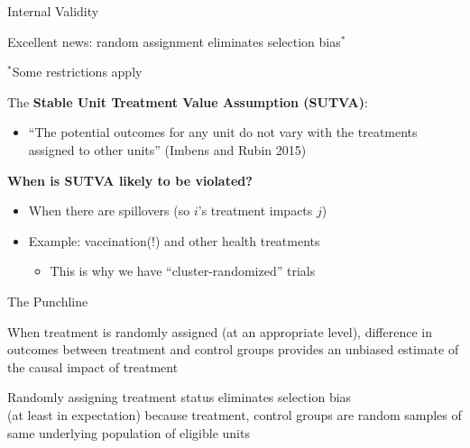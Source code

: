 \documentclass[10pt,xcolor=table,ignorenonframetext,handout,aspectratio=169]{beamer}
\newlength{\wideitemsep}
\let\olditem\item
\renewcommand{\item}{\setlength{\itemsep}{\wideitemsep}\olditem}
\begin{document}
\begin{frame}{Internal Validity}

\medskip
Excellent news:  random assignment eliminates selection bias$^{\ast}$\\
\begin{footnotesize}$^{\ast}$Some restrictions apply \end{footnotesize}

\pause
\medskip
\medskip
The \textbf{Stable Unit Treatment Value Assumption (SUTVA)}:

\medskip
\begin{itemize}
	
	\item ``The potential outcomes for any unit do not vary with the treatments assigned to other units'' (Imbens and Rubin 2015)
	
	
	
\end{itemize}

\pause
\medskip
\medskip
\textbf{When is SUTVA likely to be violated? }

\medskip
\begin{itemize}
	
	\item When there are spillovers (so $i$'s treatment impacts $j$)
	
	\item Example:  vaccination(!) and other health treatments
	
\medskip
\begin{itemize}
	
	\item This is why we have ``cluster-randomized'' trials
	
\end{itemize}
	
\end{itemize}


\end{frame}



\begin{frame}{The Punchline}

\medskip
When treatment is randomly assigned (at an appropriate level), difference in outcomes between treatment and control groups provides an unbiased estimate of the causal impact of treatment

\medskip
\medskip
Randomly assigning treatment status eliminates selection bias \\
(at least in expectation) because treatment, control groups are random samples of same underlying population of eligible units

\end{frame}
\end{document}
